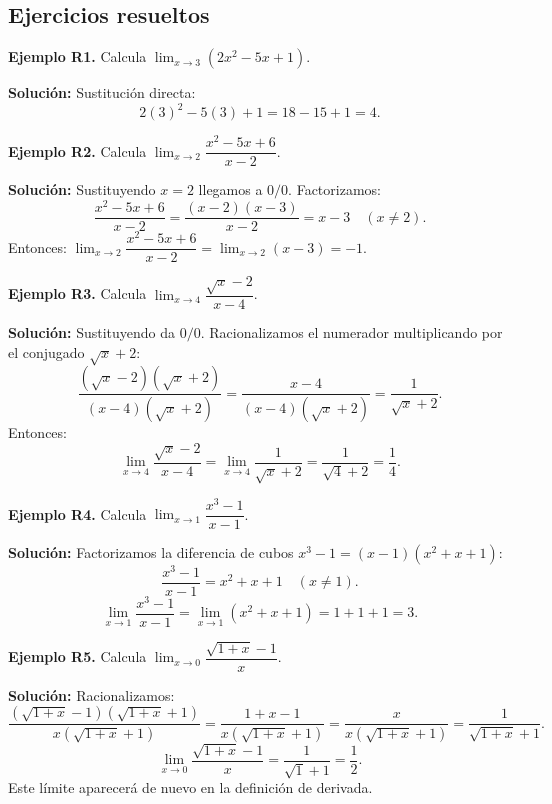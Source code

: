 \documentclass[12pt, a4paper]{article}
\begin{document}
\subsection{Ejercicios resueltos}

\textbf{Ejemplo R1.} Calcula $\lim_{x \to 3} (2x^2 - 5x + 1)$.

\begin{cuadrosolucion}
  \textbf{Solución:} Sustitución directa:
  $$2(3)^2 - 5(3) + 1 = 18 - 15 + 1 = 4.$$
\end{cuadrosolucion}

\textbf{Ejemplo R2.} Calcula $\lim_{x \to 2} \dfrac{x^2 - 5x + 6}{x - 2}$.

\begin{cuadrosolucion}
  \textbf{Solución:} Sustituyendo $x = 2$ llegamos a $0/0$. Factorizamos:
  $$\frac{x^2 - 5x + 6}{x - 2} = \frac{(x - 2)(x - 3)}{x - 2} = x - 3 \quad (x \neq 2).$$
  Entonces: $\lim_{x \to 2} \dfrac{x^2 - 5x + 6}{x - 2} = \lim_{x \to 2} (x - 3) = -1$.
\end{cuadrosolucion}

\textbf{Ejemplo R3.} Calcula $\lim_{x \to 4} \dfrac{\sqrt{x} - 2}{x - 4}$.

\begin{cuadrosolucion}
  \textbf{Solución:} Sustituyendo da $0/0$. Racionalizamos el numerador multiplicando por el conjugado $\sqrt{x} + 2$:
  $$\frac{(\sqrt{x} - 2)(\sqrt{x} + 2)}{(x - 4)(\sqrt{x} + 2)} = \frac{x - 4}{(x - 4)(\sqrt{x} + 2)} = \frac{1}{\sqrt{x} + 2}.$$
  Entonces:
  $$\lim_{x \to 4} \dfrac{\sqrt{x} - 2}{x - 4} = \lim_{x \to 4} \dfrac{1}{\sqrt{x} + 2} = \dfrac{1}{\sqrt{4} + 2} = \dfrac{1}{4}.$$
\end{cuadrosolucion}

\textbf{Ejemplo R4.} Calcula $\lim_{x \to 1} \dfrac{x^3 - 1}{x - 1}$.

\begin{cuadrosolucion}
  \textbf{Solución:} Factorizamos la diferencia de cubos $x^3 - 1 = (x - 1)(x^2 + x + 1)$:
  $$\frac{x^3 - 1}{x - 1} = x^2 + x + 1 \quad (x \neq 1).$$
  $$\lim_{x \to 1} \dfrac{x^3 - 1}{x - 1} = \lim_{x \to 1} (x^2 + x + 1) = 1 + 1 + 1 = 3.$$
\end{cuadrosolucion}

\textbf{Ejemplo R5.} Calcula $\lim_{x \to 0} \dfrac{\sqrt{1 + x} - 1}{x}$.

\begin{cuadrosolucion}
  \textbf{Solución:} Racionalizamos:
  $$\frac{(\sqrt{1 + x} - 1)(\sqrt{1 + x} + 1)}{x(\sqrt{1 + x} + 1)} = \frac{1 + x - 1}{x(\sqrt{1 + x} + 1)} = \frac{x}{x(\sqrt{1 + x} + 1)} = \frac{1}{\sqrt{1 + x} + 1}.$$
  $$\lim_{x \to 0} \dfrac{\sqrt{1 + x} - 1}{x} = \dfrac{1}{\sqrt{1} + 1} = \dfrac{1}{2}.$$
  Este límite aparecerá de nuevo en la definición de derivada.
\end{cuadrosolucion}
\end{document}
